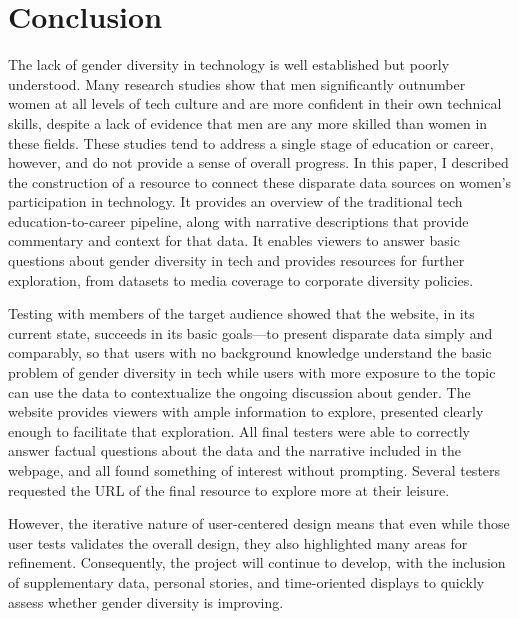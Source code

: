 \section{Conclusion}\label{sec:conclusion}
The lack of gender diversity in technology is well established but poorly understood. Many research studies show that men significantly outnumber women at all levels of tech culture and are more confident in their own technical skills, despite a lack of evidence that men are any more skilled than women in these fields. These studies tend to address a single stage of education or career, however, and do not provide a sense of overall progress. In this paper, I described the construction of a resource to connect these disparate data sources on women's participation in technology. It provides an overview of the traditional tech education-to-career pipeline, along with narrative descriptions that provide commentary and context for that data. It enables viewers to answer basic questions about gender diversity in tech and provides resources for further exploration, from datasets to media coverage to corporate diversity policies.

Testing with members of the target audience showed that the website, in its current state, succeeds in its basic goals---to present disparate data simply and comparably, so that users with no background knowledge understand the basic problem of gender diversity in tech while users with more exposure to the topic can use the data to contextualize the ongoing discussion about gender. The website provides viewers with ample information to explore, presented clearly enough to facilitate that exploration. All final testers were able to correctly answer factual questions about the data and the narrative included in the webpage, and all found something of interest without prompting. Several testers requested the URL of the final resource to explore more at their leisure.

However, the iterative nature of user-centered design means that even while those user tests validates the overall design, they also highlighted many areas for refinement. Consequently, the project will continue to develop, with the inclusion of supplementary data, personal stories, and time-oriented displays to quickly assess whether gender diversity is improving.
